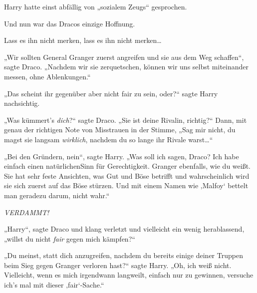 Harry hatte einst abfällig von „sozialem Zeugs“ gesprochen.

Und nun war das Dracos einzige Hoffnung.

Lass es ihn nicht merken, lass es ihn nicht merken…

„Wir sollten General Granger zuerst angreifen und sie aus dem Weg schaffen“, sagte Draco. „Nachdem wir sie zerquetschen, können wir uns selbst miteinander messen, ohne Ablenkungen.“

„Das scheint ihr gegenüber aber nicht fair zu sein, oder?“ sagte Harry nachsichtig.

„Was kümmert’s \emph{dich}?“ sagte Draco. „Sie ist deine Rivalin, richtig?“ Dann, mit genau der richtigen Note von Misstrauen in der Stimme, „Sag mir nicht, du magst sie langsam \emph{wirklich}, nachdem du so lange ihr Rivale warst…“

„Bei den Gründern, nein“, sagte Harry. „Was soll ich sagen, Draco? Ich habe einfach einen natürlichenSinn für Gerechtigkeit. Granger ebenfalls, wie du weißt. Sie hat sehr feste Ansichten, was Gut und Böse betrifft und wahrscheinlich wird sie sich zuerst auf das Böse stürzen. Und mit einem Namen wie ‚Malfoy‘ bettelt man geradezu darum, nicht wahr.“

\emph{VERDAMMT!}

„Harry“, sagte Draco und klang verletzt und vielleicht ein wenig herablassend, „willst du nicht \emph{fair} gegen mich kämpfen?“

„Du meinst, statt dich anzugreifen, nachdem du bereits einige deiner Truppen beim Sieg gegen Granger verloren hast?“ sagte Harry. „Oh, ich weiß nicht. Vielleicht, wenn es mich irgendwann langweilt, einfach nur zu gewinnen, versuche ich’s mal mit dieser ‚fair‘-Sache.“

